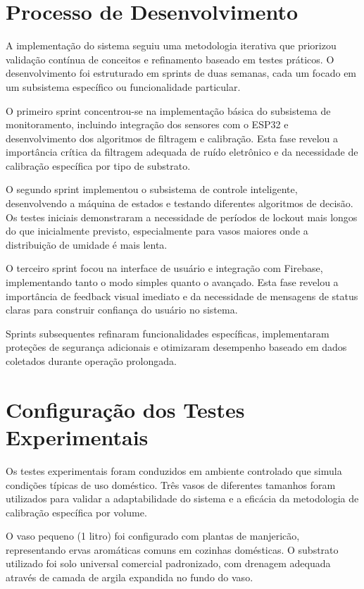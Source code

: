 \documentclass[twoside,english,brazilian]{UNISINOSmonografia}
\begin{document}
\section{Processo de Desenvolvimento}

A implementação do sistema seguiu uma metodologia iterativa que priorizou validação contínua de conceitos e refinamento baseado em testes práticos. O desenvolvimento foi estruturado em sprints de duas semanas, cada um focado em um subsistema específico ou funcionalidade particular.

O primeiro sprint concentrou-se na implementação básica do subsistema de monitoramento, incluindo integração dos sensores com o ESP32 e desenvolvimento dos algoritmos de filtragem e calibração. Esta fase revelou a importância crítica da filtragem adequada de ruído eletrônico e da necessidade de calibração específica por tipo de substrato.

O segundo sprint implementou o subsistema de controle inteligente, desenvolvendo a máquina de estados e testando diferentes algoritmos de decisão. Os testes iniciais demonstraram a necessidade de períodos de lockout mais longos do que inicialmente previsto, especialmente para vasos maiores onde a distribuição de umidade é mais lenta.

O terceiro sprint focou na interface de usuário e integração com Firebase, implementando tanto o modo simples quanto o avançado. Esta fase revelou a importância de feedback visual imediato e da necessidade de mensagens de status claras para construir confiança do usuário no sistema.

Sprints subsequentes refinaram funcionalidades específicas, implementaram proteções de segurança adicionais e otimizaram desempenho baseado em dados coletados durante operação prolongada.

\section{Configuração dos Testes Experimentais}

Os testes experimentais foram conduzidos em ambiente controlado que simula condições típicas de uso doméstico. Três vasos de diferentes tamanhos foram utilizados para validar a adaptabilidade do sistema e a eficácia da metodologia de calibração específica por volume.

O vaso pequeno (1 litro) foi configurado com plantas de manjericão, representando ervas aromáticas comuns em cozinhas domésticas. O substrato utilizado foi solo universal comercial padronizado, com drenagem adequada através de camada de argila expandida no fundo do vaso.
\end{document}
